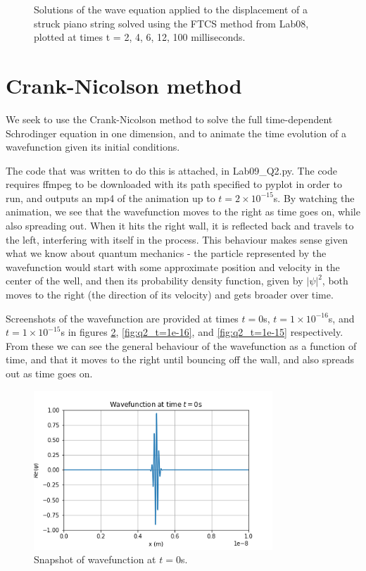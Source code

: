 \documentclass{article}
\begin{document}
\begin{figure}[H]
\begin{minipage}[b]{0.33\linewidth}
  	\end{minipage}	
 	\caption{Solutions of the wave equation applied to the displacement of a struck piano string solved using the FTCS method from Lab08, plotted at times t = 2, 4, 6, 12, 100 milliseconds.} 
\label{fig:wave_FTCS} 
\end{figure}

\section{Crank-Nicolson method}

We seek to use the Crank-Nicolson method to solve the full time-dependent Schrodinger equation in one dimension, and to animate the time evolution of a wavefunction given its initial conditions.

The code that was written to do this is attached, in Lab09\_Q2.py. The code requires ffmpeg to be downloaded with its path specified to pyplot in order to run, and outputs an mp4 of the animation up to $t=2\times 10^{-15}$s. By watching the animation, we see that the wavefunction moves to the right as time goes on, while also spreading out. When it hits the right wall, it is reflected back and travels to the left, interfering with itself in the process. This behaviour makes sense given what we know about quantum mechanics - the particle represented by the wavefunction would start with some approximate position and velocity in the center of the well, and then its probability density function, given by $|\psi|^2$, both moves to the right (the direction of its velocity) and gets broader over time.

Screenshots of the wavefunction are provided at times $t=0$s, $t=1\times 10^{-16}$s, and $t=1\times 10^{-15}$s in figures \ref{fig:q2_t=0}, \ref{fig:q2_t=1e-16}, and \ref{fig:q2_t=1e-15} respectively. From these we can see the general behaviour of the wavefunction as a function of time, and that it moves to the right until bouncing off the wall, and also spreads out as time goes on.

\begin{figure}[H]
	\centering
	\includegraphics[width=0.8\textwidth]{../images/q2_t=0.png}
	\caption{Snapshot of wavefunction at $t=0$s.}
	\label{fig:q2_t=0}
\end{figure}
\end{document}
